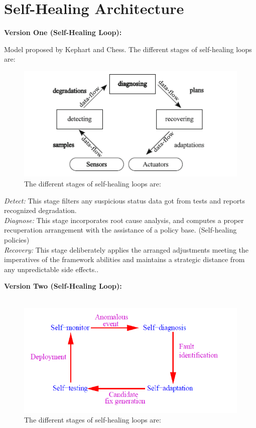 \chapter{Self-Healing Architecture} \label{ch:selfHelingArchitecture}

\textbf{Version One (Self-Healing Loop):\\}

Model proposed by Kephart and Chess. The different stages of self-healing loops are: \\


\begin{figure}[H]
\includegraphics[width=5in]{img/Figure2}
\caption{The different stages of self-healing loops are:}
\end{figure}

\textit{Detect:} This stage filters any suspicious status data got from tests and reports recognized degradation.\\

\textit{Diagnose:} This stage incorporates root cause analysis, and computes a proper recuperation arrangement with the assistance of a policy base. (Self-healing policies)\\

\textit{Recovery:} This stage deliberately applies the arranged adjustments meeting the imperatives of the framework abilities and maintains a strategic distance from any unpredictable side effects.\cite{Harald:SelfHealingSurvey:2011}.   

\textbf{Version Two (Self-Healing Loop):\\}\\

\begin{figure}[H]
\includegraphics[width=5in]{img/Figure4}
\caption{The different stages of self-healing loops are:}
\end{figure}

